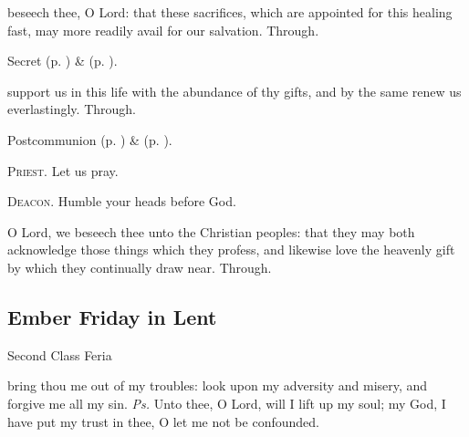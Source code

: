 
\secret
{} beseech thee, O Lord: that these sacrifices, which are appointed for this healing fast, may more readily avail for our salvation. Through.


\begin{rubric}
     Secret  (p. \pageref{AshWednesdayMassSecret}) \&   (p. \pageref{SPLivingDeparted}).
\end{rubric}


\postcommunion
{} support us in this life with the abundance of thy gifts, and by the same renew us everlastingly. Through.


\begin{rubric}
     Postcommunion  (p. \pageref{AshWednesdayMassPostcommunion}) \&   (p. \pageref{SPLivingDeparted}).
\end{rubric}

\textsc{Priest.} Let us pray.\par
\textsc{Deacon.} Humble your heads before God.\par
{} O Lord, we beseech thee unto the Christian peoples: that they may both acknowledge those things which they profess, and likewise love the heavenly gift by which they continually draw near. Through.


\clearpage
\subsection{Ember Friday in Lent}
\begin{inhead}
{Second Class Feria}
\end{inhead}


\introit
{} bring thou me out of my troubles: look upon my adversity and misery, and forgive me all my sin. \textit{Ps.} Unto thee, O Lord, will I lift up my soul; my God, I have put my trust in thee, O let me not be confounded.

